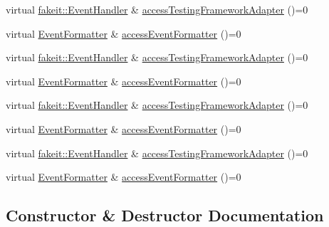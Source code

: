 \begin{DoxyCompactItemize}
\item 
virtual \mbox{\hyperlink{structfakeit_1_1EventHandler}{fakeit\+::\+Event\+Handler}} \& \mbox{\hyperlink{classfakeit_1_1AbstractFakeit_a9476180a503524d49d1978fbbc125b01}{access\+Testing\+Framework\+Adapter}} ()=0
\item 
virtual \mbox{\hyperlink{structfakeit_1_1EventFormatter}{Event\+Formatter}} \& \mbox{\hyperlink{classfakeit_1_1AbstractFakeit_a443a7ac12208c55f2ae4fa072e983476}{access\+Event\+Formatter}} ()=0
\item 
virtual \mbox{\hyperlink{structfakeit_1_1EventHandler}{fakeit\+::\+Event\+Handler}} \& \mbox{\hyperlink{classfakeit_1_1AbstractFakeit_a9476180a503524d49d1978fbbc125b01}{access\+Testing\+Framework\+Adapter}} ()=0
\item 
virtual \mbox{\hyperlink{structfakeit_1_1EventFormatter}{Event\+Formatter}} \& \mbox{\hyperlink{classfakeit_1_1AbstractFakeit_a443a7ac12208c55f2ae4fa072e983476}{access\+Event\+Formatter}} ()=0
\item 
virtual \mbox{\hyperlink{structfakeit_1_1EventHandler}{fakeit\+::\+Event\+Handler}} \& \mbox{\hyperlink{classfakeit_1_1AbstractFakeit_a9476180a503524d49d1978fbbc125b01}{access\+Testing\+Framework\+Adapter}} ()=0
\item 
virtual \mbox{\hyperlink{structfakeit_1_1EventFormatter}{Event\+Formatter}} \& \mbox{\hyperlink{classfakeit_1_1AbstractFakeit_a443a7ac12208c55f2ae4fa072e983476}{access\+Event\+Formatter}} ()=0
\item 
virtual \mbox{\hyperlink{structfakeit_1_1EventHandler}{fakeit\+::\+Event\+Handler}} \& \mbox{\hyperlink{classfakeit_1_1AbstractFakeit_a9476180a503524d49d1978fbbc125b01}{access\+Testing\+Framework\+Adapter}} ()=0
\item 
virtual \mbox{\hyperlink{structfakeit_1_1EventFormatter}{Event\+Formatter}} \& \mbox{\hyperlink{classfakeit_1_1AbstractFakeit_a443a7ac12208c55f2ae4fa072e983476}{access\+Event\+Formatter}} ()=0
\end{DoxyCompactItemize}


\subsection{Constructor \& Destructor Documentation}
\mbox{\label{classfakeit_1_1AbstractFakeit_aa5ca7471ccad64432fdb54a1bff5b070}} 
